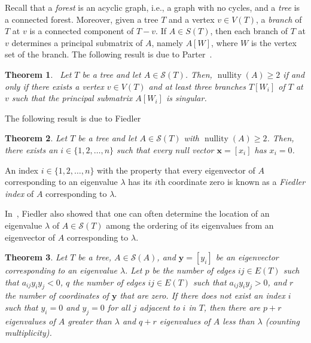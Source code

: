 \documentclass{article}
\newtheorem{theorem}{Theorem}[section]
\theoremstyle{definition}
\newcommand\nullity[1]{\operatorname{nullity}\left(#1\right)}
\begin{document}
Recall that a \emph{forest} is an acyclic graph, i.e., a graph with no cycles, and a \emph{tree} is a connected forest. 
Moreover, given a tree $T$ and a vertex $v\in V(T)$, a \emph{branch} of $T$ at $v$ is a connected component of $T-v$. 
If $A\in S(T)$, then each branch of $T$ at $v$ determines a principal submatrix of $A$, namely $A[W]$, where $W$ is the vertex set of the branch. 
The following result is due to Parter~\cite{Parter1960}.
\begin{theorem}~\label{thm:parter}
Let $T$ be a tree and let $A\in\mathcal{S}(T)$. 
Then, $\nullity{A}\geq 2$ if and only if there exists a vertex $v\in V(T)$ and at least three branches $T[W_{i}]$ of $T$ at $v$ such that the principal submatrix $A[W_{i}]$ is singular. 
\end{theorem}

The following result is due to Fiedler~\cite{Fiedler1975}
\begin{theorem}\label{thm:fiedler1}
Let $T$ be a tree and let $A\in\mathcal{S}(T)$ with $\nullity{A}\geq 2$.
Then, there exists an $i\in\{1,2,\ldots,n\}$ such that every null vector $\textbf{x}=[x_{i}]$ has $x_{i}=0$.
\end{theorem}

An index $i\in\{1,2,\ldots,n\}$ with the property that every eigenvector of $A$ corresponding to an eigenvalue $\lambda$ has its $i$th coordinate zero is known as a \emph{Fiedler index} of $A$ corresponding to $\lambda$. 

In~\cite{Fiedler1975}, Fiedler also showed that one can often determine the location of an eigenvalue $\lambda$ of $A\in\mathcal{S}(T)$ among the ordering of its eigenvalues from an eigenvector of $A$ corresponding to $\lambda$.
\begin{theorem}\label{thm:fiedler2}
Let $T$ be a tree, $A\in\mathcal{S}(A)$, and $\textbf{y}=[y_{i}]$ be an eigenvector corresponding to an eigenvalue $\lambda$.
Let $p$ be the number of edges $ij\in E(T)$ such that $a_{ij}y_{i}y_{j}<0$, $q$ the number of edges $ij\in E(T)$ such that $a_{ij}y_{i}y_{j}>0$, and $r$ the number of coordinates of $\textbf{y}$ that are zero. 
If there does not exist an index $i$ such that $y_{i}=0$ and $y_{j}=0$ for all $j$ adjacent to $i$ in $T$, then there are $p+r$ eigenvalues of $A$ greater than $\lambda$ and $q+r$ eigenvalues of $A$ less than $\lambda$ (counting multiplicity). 
\end{theorem}
\end{document}
